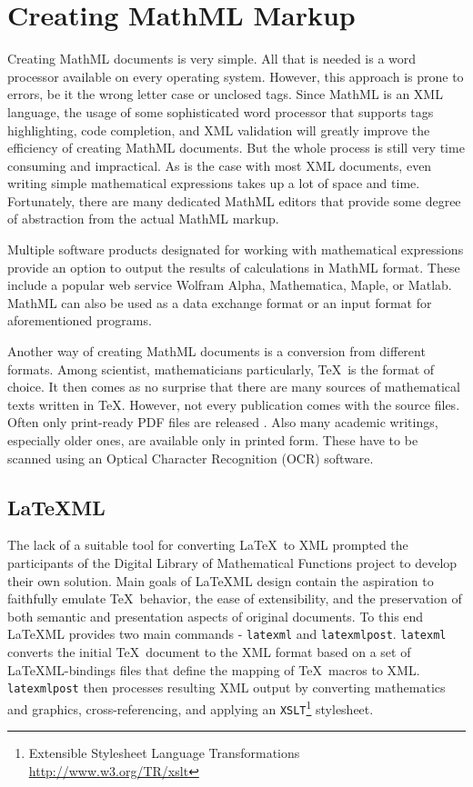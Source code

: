 \documentclass[11pt,oneside,final]{fithesis2}
\begin{document}
\section{Creating MathML Markup}
\label{sec:create-mathml}
Creating MathML documents is very simple. All that is needed is a word processor available on every operating system. However, this approach is prone to errors, be it the wrong letter case or unclosed tags. Since MathML is an XML language, the usage of some sophisticated word processor that supports tags highlighting, code completion, and XML validation will greatly improve the efficiency of creating MathML documents. But the whole process is still very time consuming and impractical. As is the case with most XML documents, even writing simple mathematical expressions takes up a lot of space and time. Fortunately, there are many dedicated MathML editors that provide some degree of abstraction from the actual MathML markup.

Multiple software products designated for working with mathematical expressions provide an option to output the results of calculations in MathML format. These include a popular web service Wolfram Alpha, Mathematica, Maple, or Matlab. MathML can also be used as a data exchange format or an input format for aforementioned programs.

Another way of creating MathML documents is a conversion from different formats. Among scientist, mathematicians particularly, \TeX\ is the format of choice. It then comes as no surprise that there are many sources of mathematical texts written in \TeX. However, not every publication comes with the source files. Often only print-ready PDF files are released \cite{baker2011towards}. Also many academic writings, especially older ones, are available only in printed form. These have to be scanned using an Optical Character Recognition (OCR) software. 

\subsection{\LaTeX ML}
\label{section:latexml}
The lack of a suitable tool for converting \LaTeX\ to XML prompted the participants of the Digital Library of Mathematical Functions project to develop their own solution. Main goals of \LaTeX ML \cite{latexml:miller2013} design contain the aspiration to faithfully emulate \TeX\ behavior, the ease of extensibility, and the preservation of both semantic and presentation aspects of original documents. To this end \LaTeX ML provides two main commands - \texttt{latexml} and \texttt{latexmlpost}. \texttt{latexml} converts the initial \TeX\ document to the XML format based on a set of \LaTeX ML-bindings files that define the mapping of \TeX\ macros to XML. \texttt{latexmlpost} then processes resulting XML output by converting mathematics
and graphics, cross-referencing, and applying an \texttt{XSLT}\footnote{Extensible Stylesheet Language Transformations \url{http://www.w3.org/TR/xslt}} stylesheet. 
\end{document}
